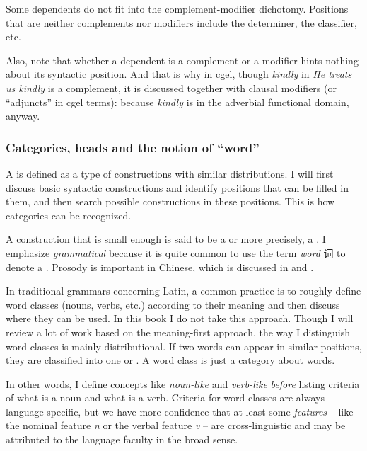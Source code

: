 \documentclass[../main.tex]{subfiles}
\begin{document}
Some dependents do not fit into the complement-modifier dichotomy. 
Positions that are neither complements nor modifiers include the determiner, the classifier, etc.

Also, note that whether a dependent is a complement or a modifier hints nothing about its syntactic position. 
And that is why in \ac{cgel}, though \emph{kindly} in \emph{He treats us kindly} is a complement,
it is discussed together with clausal modifiers (or ``adjuncts'' in \ac{cgel} terms):
because \emph{kindly} is in the adverbial functional domain, anyway.

\subsubsection{Categories, heads and the notion of ``word''}

A  is defined as a type of constructions with similar distributions.
I will first discuss basic syntactic constructions and identify positions that can be filled in them, 
and then search possible constructions in these positions. This is how categories can be recognized.

A construction that is small enough is said to be a  or more precisely, 
a .
I emphasize \emph{grammatical} because it is quite common to use the term \emph{word} 词 to denote 
a . Prosody is important in Chinese, which is discussed in 
 and . 

In traditional grammars concerning Latin, 
a common practice is to roughly define word classes (nouns, verbs, etc.) 
according to their meaning and then discuss where they can be used. 
In this book I do not take this approach. 
Though I will review a lot of work based on the meaning-first approach, 
the way I distinguish word classes is mainly distributional. 
If two words can appear in similar positions, 
they are classified into one  or .
A word class is just a category about words.  

In other words, I define concepts like \emph{noun-like} and \emph{verb-like} \emph{before} listing criteria of 
what is a noun and what is a verb. Criteria for word classes are always language-specific, but we have more 
confidence that at least some \emph{features} -- like the nominal feature \textit{n} or the verbal feature 
\textit{v} -- are cross-linguistic and may be attributed to the language faculty in the broad sense. 
\end{document}
